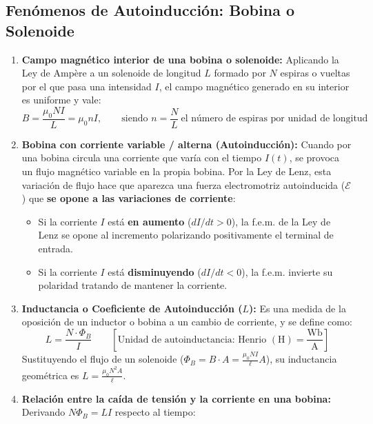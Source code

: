 \subsection{Fenómenos de Autoinducción: Bobina o Solenoide}

\begin{ley}
\begin{enumerate}[leftmargin=*]
    \item \textbf{Campo magnético interior de una bobina o solenoide:} Aplicando la Ley de Ampère a un solenoide de longitud $L$ formado por $N$ espiras o vueltas por el que pasa una intensidad $I$, el campo magnético generado en su interior es uniforme y vale:
    \begin{equation}
        B = \frac{\mu_0 N I}{L} = \mu_0 n I, \qquad \text{siendo } n = \frac{N}{L}\ \text{el número de espiras por unidad de longitud}
    \end{equation}
    \item \textbf{Bobina con corriente variable / alterna (Autoinducción):} Cuando por una bobina circula una corriente que varía con el tiempo $I(t)$, se provoca un flujo magnético variable en la propia bobina. Por la Ley de Lenz, esta variación de flujo hace que aparezca una fuerza electromotriz autoinducida ($\mathcal{E}$) que \textbf{se opone a las variaciones de corriente}:
    \begin{itemize}[leftmargin=*]
        \item Si la corriente $I$ está \textbf{en aumento} ($dI/dt > 0$), la f.e.m. de la Ley de Lenz se opone al incremento polarizando positivamente el terminal de entrada.
        \item Si la corriente $I$ está \textbf{disminuyendo} ($dI/dt < 0$), la f.e.m. invierte su polaridad tratando de mantener la corriente.
    \end{itemize}
    \item \textbf{Inductancia o Coeficiente de Autoinducción ($L$):} Es una medida de la oposición de un inductor o bobina a un cambio de corriente, y se define como:
    \begin{equation}
        L = \frac{N \cdot \Phi_B}{I} \qquad \left[\text{Unidad de autoinductancia: Henrio } (\si{\henry}) = \frac{\si{\weber}}{\si{\ampere}}\right]
    \end{equation}
    Sustituyendo el flujo de un solenoide ($\Phi_B = B \cdot A = \frac{\mu_0 N I}{\ell} A$), su inductancia geométrica es $L = \frac{\mu_0 N^2 A}{\ell}$.
    \item \textbf{Relación entre la caída de tensión y la corriente en una bobina:} Derivando $N \Phi_B = L I$ respecto al tiempo:

\end{enumerate}
\end{ley}
